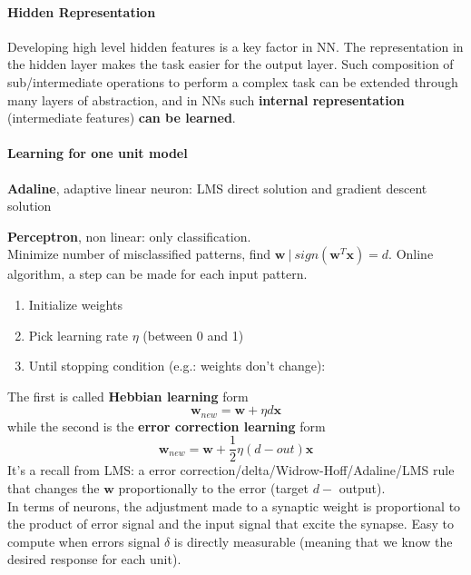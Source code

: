 \documentclass[10pt]{report}
\begin{document}
\paragraph{Hidden Representation} Developing high level hidden features is a key factor in NN. The representation in the hidden layer makes the task easier for the output layer. Such composition of sub/intermediate operations to perform a complex task can be extended through many layers of abstraction, and in NNs such \textbf{internal representation} (intermediate features) \textbf{can be learned}.
\paragraph{Learning for one unit model} \begin{list}{}{}
	\item \textbf{Adaline}, adaptive linear neuron: LMS direct solution and gradient descent solution
	\item \textbf{Perceptron}, non linear: only classification.\\
	Minimize number of misclassified patterns, find $\mathbf{w}\:|\:sign(\mathbf{w}^T\mathbf{x}) = d$. Online algorithm, a step can be made for each input pattern.
	\begin{enumerate}
		\item Initialize weights
		\item Pick learning rate $\eta$ (between 0 and 1)
		\item Until stopping condition (e.g.: weights don't change):
	\end{enumerate}
	The first is called \textbf{Hebbian learning} form $$\mathbf{w}_{new} = \mathbf{w} + \eta d \mathbf{x}$$ while the second is the \textbf{error correction learning} form $$\mathbf{w}_{new} = \mathbf{w} + \frac{1}{2}\eta (d-out) \mathbf{x}$$
	It's a recall from LMS: a error correction/delta/Widrow-Hoff/Adaline/LMS rule that changes the $\mathbf{w}$ proportionally to the error (target $d -$ output).\\
	In terms of neurons, the adjustment made to a synaptic weight is proportional to the product of error signal and the input signal that excite the synapse. Easy to compute when errors signal $\delta$ is directly measurable (meaning that we know the desired response for each unit).
\end{list}
\end{document}
